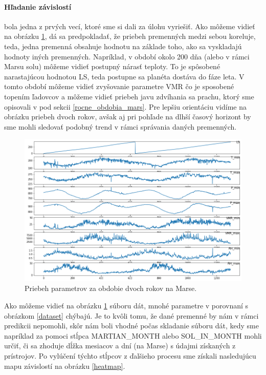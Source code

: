 \paragraph{Hľadanie závislostí} bola jedna z prvých vecí, ktoré sme si dali za úlohu vyriešiť. Ako môžeme vidieť na obrázku \ref{fulldf}, dá sa predpokladať, že priebeh premenných medzi sebou koreluje, teda, jedna premenná obsahuje hodnotu na základe toho, ako sa vyskladajú hodnoty iných premenných. Napríklad, v období okolo 200 dňa (alebo v rámci Marsu solu) môžeme vidieť postupný nárasť teploty. To je spôsobené narastajúcou hodnotou LS, teda postupne sa planéta dostáva do fáze leta. V tomto období môžeme vidieť zvyšovanie parametre VMR čo je sposobené topením ľadovcov a môžeme vidieť priebeh javu zdvíhania sa prachu, ktorý sme opisovali v pod sekcii \ref{rocne_obdobia_mars}. Pre lepšiu orientáciu vidíme na obrázku priebeh dvoch rokov, avšak aj pri pohľade na dlhší časový horizont by sme mohli sledovať podobný trend v rámci správania daných premenných. 

\begin{figure}[!htbp]
  \centering
  \includegraphics[width=16cm]{img/full_df.png}
  \caption{Priebeh parametrov za obdobie dvoch rokov na Marse.}
  \label{fulldf}
\end{figure}

Ako môžeme vidieť na obrázku \ref{fulldf} súboru dát, mnohé parametre v porovnaní s obrázkom \ref{dataset} chýbajú. Je to kvôli tomu, že dané premenné by nám v rámci predikcii nepomohli, skôr nám boli vhodné počas skladanie súboru dát, kedy sme napríklad za pomoci stĺpca MARTIAN\_MONTH alebo SOL\_IN\_MONTH mohli určiť, či sa zhoduje dĺžka mesiacov a dní (na Marse) s údajmi získaných z prístrojov. Po vylúčení týchto stĺpcov z ďalšieho procesu sme získali nasledujúcu mapu závislostí na obrázku \ref{heatmap}.

